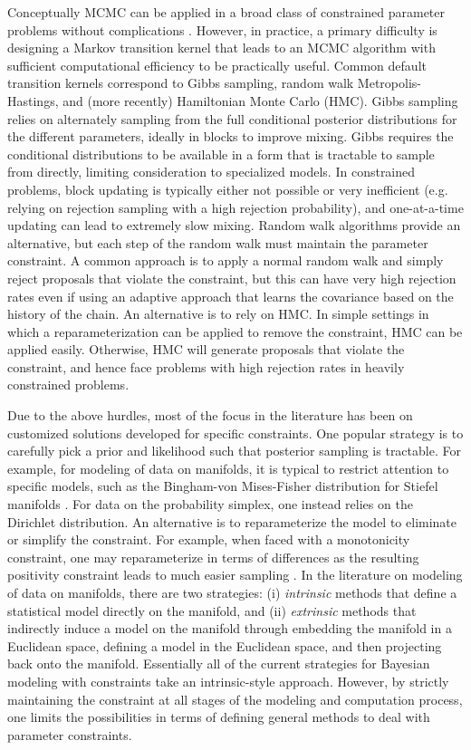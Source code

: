 \documentclass[10pt]{article}
\DeclareMathOperator{\1}{\mathbbm{1}}
\begin{document}
Conceptually MCMC can be applied in a broad class of constrained parameter problems without complications \citep{gelfand1992bayesian}. However, in practice, a primary difficulty is designing a Markov transition kernel that leads to an MCMC algorithm with sufficient computational efficiency to be practically useful. Common default transition kernels correspond to Gibbs sampling, random walk Metropolis-Hastings, and (more recently) Hamiltonian Monte Carlo (HMC). Gibbs sampling relies on alternately sampling from the full conditional posterior distributions for the different parameters, ideally in blocks to improve mixing. Gibbs requires the conditional distributions to be available in a form that is tractable to sample from directly, limiting consideration to specialized models. In constrained problems, block updating is typically either not possible or very inefficient (e.g. relying on rejection sampling with a high rejection probability), and one-at-a-time updating can lead to extremely slow mixing. Random walk algorithms provide an alternative, but each step of the random walk must maintain the parameter constraint. A common approach is to apply a normal random walk and simply reject proposals that violate the constraint, but this can have very high rejection rates even if using an adaptive approach that learns the covariance based on the history of the chain. An alternative is to rely on HMC. In simple settings in which a reparameterization can be applied to remove the constraint, HMC can be applied easily. Otherwise, HMC will generate proposals that violate the constraint, and hence face problems with high rejection rates in heavily constrained problems.

Due to the above hurdles, most of the focus in the literature has been on customized solutions developed for specific constraints.
One popular strategy is to carefully pick a prior and likelihood such that posterior sampling is tractable. For example, for modeling of data on manifolds, it is typical to restrict attention to specific models, such as the Bingham-von Mises-Fisher distribution for Stiefel manifolds \citep{khatri1977mises,hoff2009simulation}. For data on the probability simplex, one instead relies on the Dirichlet distribution. An alternative is to reparameterize the model to eliminate or simplify the constraint. For example, when faced with a monotonicity constraint, one may reparameterize in terms of differences as the resulting positivity constraint leads to much easier sampling \citep{dunson2003bayesian,gunn2005transformation}. In the literature on modeling of data on manifolds, there are two strategies: (i) {\em intrinsic} methods that define a statistical model directly on the manifold, and (ii) {\em extrinsic} methods that indirectly induce a model on the manifold through embedding the manifold in a Euclidean space, defining a model in the Euclidean space, and then projecting back onto the manifold. Essentially all of the current strategies for Bayesian modeling with constraints take an intrinsic-style approach. However, by strictly maintaining the constraint at all stages of the modeling and computation process, one limits the possibilities in terms of defining general methods to deal with parameter constraints.
\end{document}
